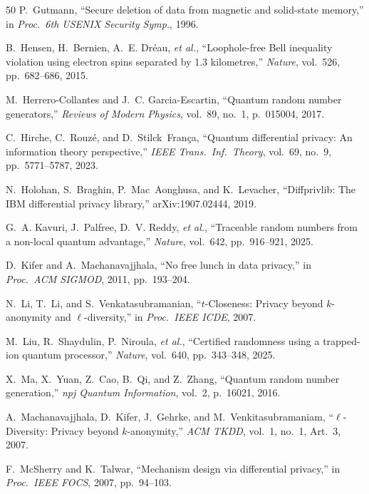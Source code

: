 \documentclass[acmsmall,screen,review,anonymous]{acmart}
\begin{document}
\begin{thebibliography}{50}
P.~Gutmann, ``Secure deletion of data from magnetic and solid-state memory,'' in \emph{Proc.\ 6th USENIX Security Symp.}, 1996.

B.~Hensen, H.~Bernien, A.~E. Dr\'{e}au, \emph{et al.}, ``Loophole-free Bell inequality violation using electron spins separated by 1.3 kilometres,'' \emph{Nature}, vol.~526, pp.~682--686, 2015.

M.~Herrero-Collantes and J.~C. Garcia-Escartin, ``Quantum random number generators,'' \emph{Reviews of Modern Physics}, vol.~89, no.~1, p.~015004, 2017.

C.~Hirche, C.~Rouz\'{e}, and D.~Stilck~Fran\c{c}a, ``Quantum differential privacy: An information theory perspective,'' \emph{IEEE Trans.\ Inf.\ Theory}, vol.~69, no.~9, pp.~5771--5787, 2023.

N.~Holohan, S.~Braghin, P.~Mac~Aonghusa, and K.~Levacher, ``Diffprivlib: The {IBM} differential privacy library,'' arXiv:1907.02444, 2019.

G.~A. Kavuri, J.~Palfree, D.~V. Reddy, \emph{et al.}, ``Traceable random numbers from a non-local quantum advantage,'' \emph{Nature}, vol.~642, pp.~916--921, 2025.

D.~Kifer and A.~Machanavajjhala, ``No free lunch in data privacy,'' in \emph{Proc.\ ACM SIGMOD}, 2011, pp.~193--204.

N.~Li, T.~Li, and S.~Venkatasubramanian, ``$t$-Closeness: Privacy beyond $k$-anonymity and $\ell$-diversity,'' in \emph{Proc.\ IEEE ICDE}, 2007.

M.~Liu, R.~Shaydulin, P.~Niroula, \emph{et al.}, ``Certified randomness using a trapped-ion quantum processor,'' \emph{Nature}, vol.~640, pp.~343--348, 2025.

X.~Ma, X.~Yuan, Z.~Cao, B.~Qi, and Z.~Zhang, ``Quantum random number generation,'' \emph{npj Quantum Information}, vol.~2, p.~16021, 2016.

A.~Machanavajjhala, D.~Kifer, J.~Gehrke, and M.~Venkitasubramaniam, ``$\ell$-Diversity: Privacy beyond $k$-anonymity,'' \emph{ACM TKDD}, vol.~1, no.~1, Art.~3, 2007.

F.~McSherry and K.~Talwar, ``Mechanism design via differential privacy,'' in \emph{Proc.\ IEEE FOCS}, 2007, pp.~94--103.


\end{thebibliography}
\end{document}
